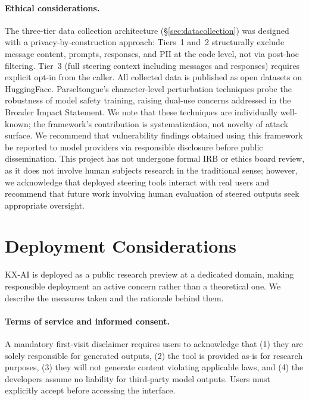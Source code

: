 \documentclass[11pt]{article}
\begin{document}
\paragraph{Ethical considerations.}
The three-tier data collection architecture (\S\ref{sec:datacollection}) was designed with a privacy-by-construction approach: Tiers~1 and~2 structurally exclude message content, prompts, responses, and PII at the code level, not via post-hoc filtering. Tier~3 (full steering context including messages and responses) requires explicit opt-in from the caller. All collected data is published as open datasets on HuggingFace.
Parseltongue's character-level perturbation techniques probe the robustness of model safety training, raising dual-use concerns addressed in the Broader Impact Statement. We note that these techniques are individually well-known; the framework's contribution is systematization, not novelty of attack surface.
We recommend that vulnerability findings obtained using this framework be reported to model providers via responsible disclosure before public dissemination. This project has not undergone formal IRB or ethics board review, as it does not involve human subjects research in the traditional sense; however, we acknowledge that deployed steering tools interact with real users and recommend that future work involving human evaluation of steered outputs seek appropriate oversight.

\section{Deployment Considerations}
\label{sec:deployment}

KX-AI is deployed as a public research preview at a dedicated domain, making responsible deployment an active concern rather than a theoretical one. We describe the measures taken and the rationale behind them.

\paragraph{Terms of service and informed consent.} A mandatory first-visit disclaimer requires users to acknowledge that (1) they are solely responsible for generated outputs, (2) the tool is provided as-is for research purposes, (3) they will not generate content violating applicable laws, and (4) the developers assume no liability for third-party model outputs. Users must explicitly accept before accessing the interface.
\end{document}
